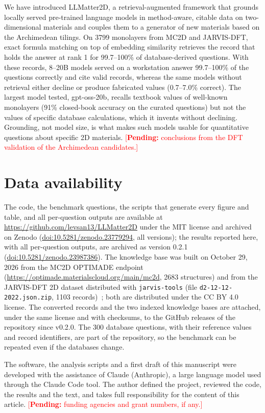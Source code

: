 \documentclass[prmaterials,twocolumn,superscriptaddress,longbibliography,nofootinbib]{revtex4-2}
\newcommand{\pending}[1]{\textcolor{red}{[\textbf{Pending:} #1]}}
\newcommand{\code}[1]{\texttt{#1}}
\begin{document}
We have introduced LLMatter2D, a retrieval-augmented framework that grounds locally served
pre-trained language models in method-aware, citable data on two-dimensional materials and
couples them to a generator of new materials based on the Archimedean tilings. On 3799
monolayers from MC2D and JARVIS-DFT, exact formula matching on top of embedding similarity
retrieves the record that holds the answer at rank 1 for 99.7--100\% of database-derived
questions. With these records, 8--20B models served on a workstation answer 99.7--100\% of
the questions correctly and cite valid records, whereas the same models without retrieval
either decline or produce fabricated values (0.7--7.0\% correct). The largest model tested,
gpt-oss-20b, recalls textbook values of well-known monolayers (91\% closed-book accuracy on
the curated questions) but not the values of specific database calculations, which it
invents without declining. Grounding, not model size, is what makes such models usable for
quantitative questions about specific 2D materials.
\pending{conclusions from the DFT validation of the Archimedean candidates.}

\section*{Data availability}

The code, the benchmark questions, the scripts that generate every figure and table, and all
per-question outputs are available at \url{https://github.com/levsan13/LLMatter2D} under the
MIT license and archived on Zenodo
(\href{https://doi.org/10.5281/zenodo.23779294}{doi:10.5281/zenodo.23779294}, all versions);
the results reported here, with all per-question outputs, are archived as version
0.2.1~\cite{LLMatter2D}
(\href{https://doi.org/10.5281/zenodo.23987386}{doi:10.5281/zenodo.23987386}). The knowledge
base was built on October 29, 2026 from the MC2D OPTIMADE endpoint
(\url{https://optimade.materialscloud.org/main/mc2d}, 2683 structures) and from the JARVIS-DFT
2D dataset distributed with \code{jarvis-tools} (file \code{d2-12-12-2022.json.zip}, 1103
records)~\cite{JarvisFigshare}; both are distributed under the CC BY 4.0 license. The
converted records and the two indexed knowledge bases are attached, under the same license
and with checksums, to the GitHub releases of the repository since v0.2.0. The 300 database questions,
with their reference values and record identifiers, are part of the repository, so the
benchmark can be repeated even if the databases change.

\begin{acknowledgments}
The software, the analysis scripts and a first draft of this manuscript were developed with
the assistance of Claude (Anthropic), a large language model used through the Claude Code
tool. The author defined the project, reviewed the code, the results and the text, and takes
full responsibility for the content of this article.
\pending{funding agencies and grant numbers, if any.}
\end{acknowledgments}


\end{document}
